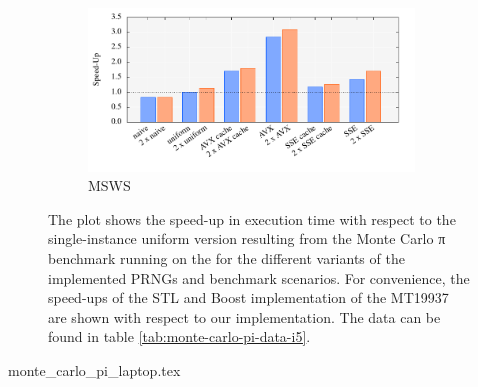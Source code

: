 \documentclass{stdlocal}
\begin{document}
\begin{figure}[H]
    \begin{subfigure}[b]{\textwidth}
      \center
      \includegraphics[width=0.95\textwidth]{plots/monte_carlo_pi_laptop_msws.pdf}
      \caption{MSWS}
    \end{subfigure}
    \caption[Monte Carlo π Benchmark Speed-Up for ]{%
      The plot shows the speed-up in execution time with respect to the single-instance uniform version resulting from the Monte Carlo π benchmark running on the  for the different variants of the implemented PRNGs and benchmark scenarios.
      For convenience, the speed-ups of the STL and Boost implementation of the MT19937 are shown with respect to our implementation.
      The data can be found in table \ref{tab:monte-carlo-pi-data-i5}.
    }
    \label{fig:monte-carlo-pi-speedup-i5}
  \end{figure}

  \begin{table}[H]
    \center
    \caption[Monte Carlo π Benchmark Data for ]{%
      The table shows the results achieved by running the Monte Carlo π Benchmark on the  with all implemented variants of given PRNGs and benchmark scenarios.
      While running the benchmark, $10^{8}$ samples in the unit square were used to estimate the value of π.
      It was ensured that the estimation error was small enough according to the calculation at the end of section \ref{sub:monte_carlo_integration}.
      During the execution, there were no cache or branch misses.
      The values for cycles, instructions, and IPCs were averaged over the number of samples in the unit square.
    }
    \label{tab:monte-carlo-pi-data-i5}
    \footnotesize
    \renewcommand{\arraystretch}{1.2}
    {monte_carlo_pi_laptop.tex}
  \end{table}
\end{document}
